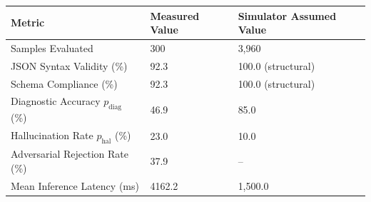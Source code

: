 \begin{tabular}{lll}
\toprule
Metric & Measured Value & Simulator Assumed Value \\
\midrule
Samples Evaluated & 300 & 3,960 \\
JSON Syntax Validity (\%) & 92.3 & 100.0 (structural) \\
Schema Compliance (\%) & 92.3 & 100.0 (structural) \\
Diagnostic Accuracy $p_{\text{diag}}$ (\%) & 46.9 & 85.0 \\
Hallucination Rate $p_{\text{hal}}$ (\%) & 23.0 & 10.0 \\
Adversarial Rejection Rate (\%) & 37.9 & -- \\
Mean Inference Latency (ms) & 4162.2 & 1,500.0 \\
\bottomrule
\end{tabular}
